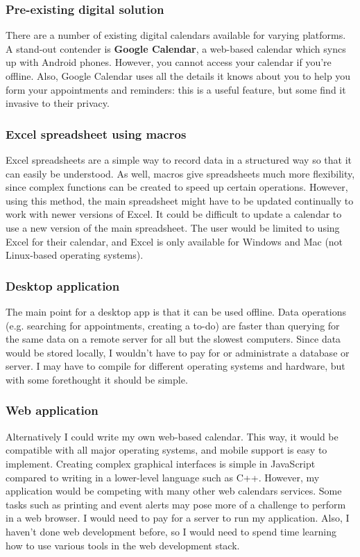 \subsubsection{Pre-existing digital solution}

There are a number of existing digital calendars available for varying
platforms. A stand-out contender is \textbf{Google Calendar}, a web-based
calendar which syncs up with Android phones. However, you cannot access your
calendar if you're offline. Also, Google Calendar uses all the details it knows
about you to help you form your appointments and reminders: this is a useful
feature, but some find it invasive to their privacy.


\subsubsection{Excel spreadsheet using macros}

Excel spreadsheets are a simple way to record data in a structured way so that
it can easily be understood. As well, macros give spreadsheets much more
flexibility, since complex functions can be created to speed up certain
operations. However, using this method, the main spreadsheet might have to be
updated continually to work with newer versions of Excel. It could be difficult
to update a calendar to use a new version of the main spreadsheet. The user
would be limited to using Excel for their calendar, and Excel is only available
for Windows and Mac (not Linux-based operating systems).


\subsubsection{Desktop application}

The main point for a desktop app is that it can be used offline. Data operations
(e.g. searching for appointments, creating a to-do) are faster than querying for
the same data on a remote server for all but the slowest computers. Since data
would be stored locally, I wouldn't have to pay for or administrate a database
or server. I may have to compile for different operating systems and hardware,
but with some forethought it should be simple.


\subsubsection{Web application}

Alternatively I could write my own web-based calendar. This way, it would be
compatible with all major operating systems, and mobile support is easy to
implement. Creating complex graphical interfaces is simple in JavaScript
compared to writing in a lower-level language such as C++. However, my
application would be competing with many other web calendars services. Some
tasks such as printing and event alerts may pose more of a challenge to perform
in a web browser. I would need to pay for a server to run my application. Also,
I haven't done web development before, so I would need to spend time learning
how to use various tools in the web development stack.


